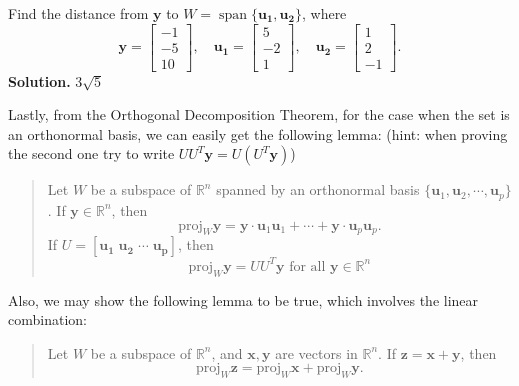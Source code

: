 \documentclass[10pt, a4paper]{article}
\newcommand{\R}{\mathbb{R}}
\newcommand{\vt}[1]{\mathbf{#1}}
\begin{document}
\begin{example}
    Find the distance from $\vt{y}$ to $W=\operatorname*{span}\{\vt{u_1},\vt{u_2}\}$, where\[
    \vt{y}=\begin{bmatrix}
        -1\\-5\\10
    \end{bmatrix}, \quad \vt{u_1}=\begin{bmatrix}
        5\\-2\\1
    \end{bmatrix}, \quad \vt{u_2}=\begin{bmatrix}
        1\\2\\-1
    \end{bmatrix}.
    \]
    \textbf{Solution.} $3\sqrt{5}$
\end{example}
\indent Lastly, from the Orthogonal Decomposition Theorem, for the case when the set is an orthonormal basis, we can easily get the following lemma: (hint: when proving the second one try to write $UU^T\vt{y}=U(U^T\vt{y})$)
\begin{quotation}
    Let $W$ be a subspace of $\R^n$ spanned by an orthonormal basis $\{\vt{u}_1, \vt{u}_2, \cdots, \vt{u}_p\}$. If $\vt{y}\in\R^n$, then $$\text{proj}_W\vt{y} = \vt{y}\cdot\vt{u}_1\vt{u}_1+\cdots+\vt{y}\cdot\vt{u}_p\vt{u}_p.$$
    If $U=[\vt{u_1}\; \vt{u_2}\; \cdots \; \vt{u_p}]$, then $$\text{proj}_W\vt{y} = UU^T\vt{y} \text{ for all }\vt{y}\in \R^n$$
\end{quotation}
\indent Also, we may show the following lemma to be true, which involves the linear combination:
\begin{quotation}
    Let $W$ be a subspace of $\R^n$, and $\vt{x},\vt{y}$ are vectors in $\R^n$. If $\vt{z}=\vt{x}+\vt{y}$, then\[
    \text{proj}_W\vt{z} = \text{proj}_W\vt{x} + \text{proj}_W\vt{y}.
    \]
\end{quotation}
\end{document}
